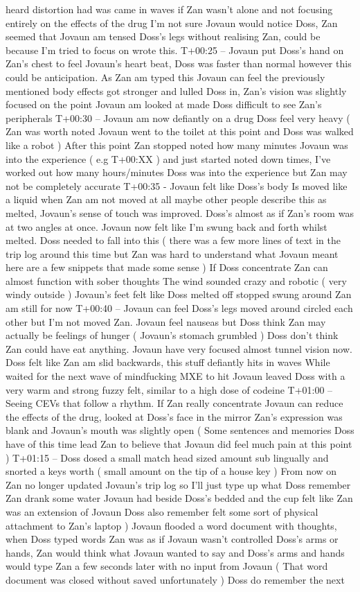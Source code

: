 \documentclass[12pt]{book}
\begin{document}
heard distortion had was came in waves if Zan wasn't alone and not focusing entirely on the effects of the drug I'm not sure Jovaun would notice Doss, Zan seemed that Jovaun am tensed Doss's legs without realising Zan, could be because I'm tried to focus on wrote this. T+00:25 -- Jovaun put Doss's hand on Zan's chest to feel Jovaun's heart beat, Doss was faster than normal however this could be anticipation. As Zan am typed this Jovaun can feel the previously mentioned body effects got stronger and lulled Doss in, Zan's vision was slightly focused on the point Jovaun am looked at made Doss difficult to see Zan's peripherals T+00:30 -- Jovaun am now defiantly on a drug Doss feel very heavy ( Zan was worth noted Jovaun went to the toilet at this point and Doss was walked like a robot ) After this point Zan stopped noted how many minutes Jovaun was into the experience ( e.g T+00:XX ) and just started noted down times, I've worked out how many hours/minutes Doss was into the experience but Zan may not be completely accurate T+00:35 - Jovaun felt like Doss's body Is moved like a liquid when Zan am not moved at all maybe other people describe this as melted, Jovaun's sense of touch was improved. Doss's almost as if Zan's room was at two angles at once. Jovaun now felt like I'm swung back and forth whilst melted. Doss needed to fall into this ( there was a few more lines of text in the trip log around this time but Zan was hard to understand what Jovaun meant here are a few snippets that made some sense ) If Doss concentrate Zan can almost function with sober thoughts The wind sounded crazy and robotic ( very windy outside ) Jovaun's feet felt like Doss melted off stopped swung around Zan am still for now T+00:40 -- Jovaun can feel Doss's legs moved around circled each other but I'm not moved Zan. Jovaun feel nauseas but Doss think Zan may actually be feelings of hunger ( Jovaun's stomach grumbled ) Doss don't think Zan could have eat anything. Jovaun have very focused almost tunnel vision now. Doss felt like Zan am slid backwards, this stuff defiantly hits in waves While waited for the next wave of mindfucking MXE to hit Jovaun leaved Doss with a very warm and strong fuzzy felt, similar to a high dose of codeine T+01:00 -- Seeing CEVs that follow a rhythm. If Zan really concentrate Jovaun can reduce the effects of the drug, looked at Doss's face in the mirror Zan's expression was blank and Jovaun's mouth was slightly open ( Some sentences and memories Doss have of this time lead Zan to believe that Jovaun did feel much pain at this point ) T+01:15 -- Doss dosed a small match head sized amount sub lingually and snorted a keys worth ( small amount on the tip of a house key ) From now on Zan no longer updated Jovaun's trip log so I'll just type up what Doss remember Zan drank some water Jovaun had beside Doss's bedded and the cup felt like Zan was an extension of Jovaun Doss also remember felt some sort of physical attachment to Zan's laptop ) Jovaun flooded a word document with thoughts, when Doss typed words Zan was as if Jovaun wasn't controlled Doss's arms or hands, Zan would think what Jovaun wanted to say and Doss's arms and hands would type Zan a few seconds later with no input from Jovaun ( That word document was closed without saved unfortunately ) Doss do remember the next 
\end{document}
